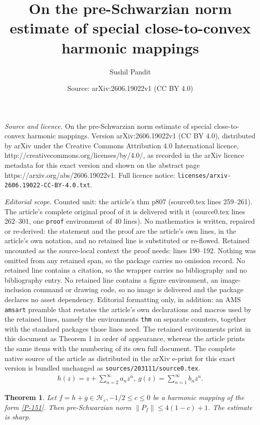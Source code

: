 \documentclass[10pt,a4paper]{amsart}
\title{On the pre-Schwarzian norm estimate of special close-to-convex harmonic mappings}
\author{Sushil Pandit}
\date{Source: arXiv:2606.19022v1 (CC BY 4.0)}
\newtheorem{thm}{Theorem}
\begin{document}
\maketitle

\noindent\emph{Source and licence.} On the pre-Schwarzian norm estimate of special close-to-convex harmonic mappings. Version arXiv:2606.19022v1 (CC BY 4.0), distributed by arXiv under the Creative Commons Attribution 4.0 International licence, http://creativecommons.org/licenses/by/4.0/, as recorded in the arXiv licence metadata for this exact version and shown on the abstract page https://arxiv.org/abs/2606.19022v1. Full licence notice: \texttt{licenses/arxiv-2606.19022-CC-BY-4.0.txt}.\par\smallskip

\noindent\textit{Editorial scope.} Counted unit: the article's thm p807 (source0.tex lines 259--261). The article's complete original proof of it is delivered with it (source0.tex lines 262--301, one \texttt{proof} environment of 40 lines). No mathematics is written, repaired or re-derived: the statement and the proof are the article's own lines, in the article's own notation, and no retained line is substituted or re-flowed.  Retained uncounted as the source-local context the proof needs: lines 190--192.  Nothing was omitted from any retained span, so the package carries no omission record.  No retained line contains a citation, so the wrapper carries no bibliography and no bibliography entry.  No retained line contains a figure environment, an image-inclusion command or drawing code, so no image is delivered and the package declares no asset dependency.  Editorial formatting only, in addition: an AMS \texttt{amsart} preamble that restates the article's own declarations and macros used by the retained lines, namely the environments \texttt{thm} on separate counters, together with the standard packages those lines need.  The retained environments print in this document as Theorem 1 in order of appearance, whereas the article prints the same items with the numbering of its own full document.  The complete native source of the article as distributed in the arXiv e-print for this exact version is bundled unchanged as \texttt{sources/203111/source0.tex}.
    \begin{align}\label{P-151}
		h(z)=z+\sum\limits_{n=2}^\infty a_nz^n,~g(z)=\sum\limits_{n=1}^\infty b_nz^n.
	\end{align}

	\begin{thm}\label{p807}
		Let $f=h+\overline{g}\in\mathcal{H}_c, -1/2\le c\le 0$ be a harmonic mapping of the form \eqref{P-151}. Then pre-Schwarzian norm $\|P_f\|\le 4(1-c)+1$. The estimate is sharp. 
	\end{thm}
\end{document}
